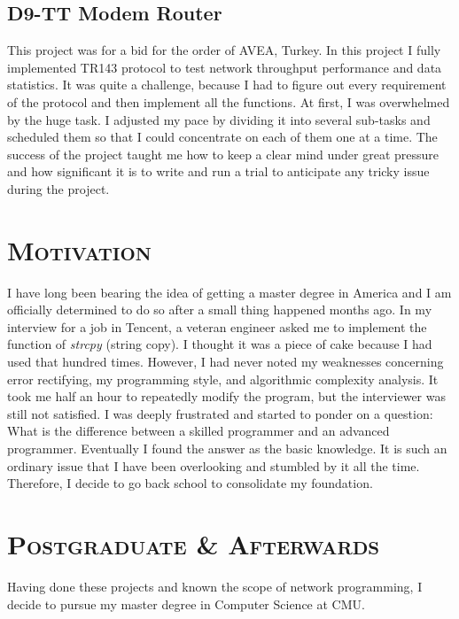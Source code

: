 \documentclass{article}
\begin{document}
\begin{multicols}{2}
		\subsection{D9-TT Modem Router}
		This project was for a bid for the order of AVEA, Turkey. In this project I fully implemented TR143 protocol to test network throughput performance and data statistics. It was quite a challenge, because I had to figure out every requirement of the protocol and then implement all the functions. At first, I was overwhelmed by the huge task. I adjusted my pace by dividing it into several sub-tasks and scheduled them so that I could concentrate on each of them one at a time. The success of the project taught me how to keep a clear mind under great pressure and how significant it is to write and run a trial to anticipate any tricky issue during the project.
		\section{\textsc{Motivation}}
		I have long been bearing the idea of getting a master degree in America and I am officially determined to do so after a small thing happened months ago. In my interview for a job in Tencent, a veteran engineer asked me to implement the function of \textit{strcpy} (string copy). I thought it was a piece of cake because I had used that hundred times. However, I had never noted my weaknesses concerning error rectifying, my programming style, and algorithmic complexity analysis. It took me half an hour to repeatedly modify the program, but the interviewer was still not satisfied. I was deeply frustrated and started to ponder on a question: What is the difference between a skilled programmer and an advanced programmer. Eventually I found the answer as the basic knowledge. It is such an ordinary issue that I have been overlooking and stumbled by it all the time. Therefore, I decide to go back  school to consolidate my foundation.
		\section{\textsc{Postgraduate \& Afterwards}}
		Having done these projects and known the scope of network programming, I decide to pursue my master degree in Computer Science at CMU.

\end{multicols}
\end{document}
